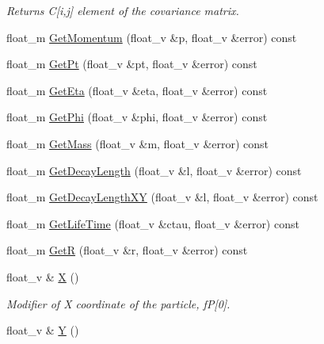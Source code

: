 \begin{DoxyCompactItemize}
\begin{DoxyCompactList}\small\item\em Returns C\mbox{[}i,j\mbox{]} element of the covariance matrix. \end{DoxyCompactList}\item 
float\+\_\+m \hyperlink{classKFParticleBaseSIMD_a7ef771f44d5ef1b9ec3cd6a05567f0f1}{Get\+Momentum} (float\+\_\+v \&p, float\+\_\+v \&error) const 
\item 
float\+\_\+m \hyperlink{classKFParticleBaseSIMD_a2be75da924159255f3dc954e0e6a3271}{Get\+Pt} (float\+\_\+v \&pt, float\+\_\+v \&error) const 
\item 
float\+\_\+m \hyperlink{classKFParticleBaseSIMD_ab67bce164eba1fa6e68b8ffc2eac6e7f}{Get\+Eta} (float\+\_\+v \&eta, float\+\_\+v \&error) const 
\item 
float\+\_\+m \hyperlink{classKFParticleBaseSIMD_a94c1bacdec14ef93110b1dfb141073ad}{Get\+Phi} (float\+\_\+v \&phi, float\+\_\+v \&error) const 
\item 
float\+\_\+m \hyperlink{classKFParticleBaseSIMD_ac8690a32660c0f65990b10c875c2f2af}{Get\+Mass} (float\+\_\+v \&m, float\+\_\+v \&error) const 
\item 
float\+\_\+m \hyperlink{classKFParticleBaseSIMD_a74a930684c0796e5925365cb27a01730}{Get\+Decay\+Length} (float\+\_\+v \&l, float\+\_\+v \&error) const 
\item 
float\+\_\+m \hyperlink{classKFParticleBaseSIMD_a36d374972632038adb3c40d2413af473}{Get\+Decay\+Length\+XY} (float\+\_\+v \&l, float\+\_\+v \&error) const 
\item 
float\+\_\+m \hyperlink{classKFParticleBaseSIMD_afcf43ad8f2972af95843614f71073df8}{Get\+Life\+Time} (float\+\_\+v \&ctau, float\+\_\+v \&error) const 
\item 
float\+\_\+m \hyperlink{classKFParticleBaseSIMD_a39b53aee81bd8fa790629afbf8777804}{GetR} (float\+\_\+v \&r, float\+\_\+v \&error) const 
\item 
float\+\_\+v \& \hyperlink{classKFParticleBaseSIMD_ad595a2d626eaa6bd262e8cfe7e8a4dc4}{X} ()\hypertarget{classKFParticleBaseSIMD_ad595a2d626eaa6bd262e8cfe7e8a4dc4}{}\label{classKFParticleBaseSIMD_ad595a2d626eaa6bd262e8cfe7e8a4dc4}

\begin{DoxyCompactList}\small\item\em Modifier of X coordinate of the particle, fP\mbox{[}0\mbox{]}. \end{DoxyCompactList}\item 
float\+\_\+v \& \hyperlink{classKFParticleBaseSIMD_af9ee57d22217d5adb101c19d944ef437}{Y} ()\hypertarget{classKFParticleBaseSIMD_af9ee57d22217d5adb101c19d944ef437}{}\label{classKFParticleBaseSIMD_af9ee57d22217d5adb101c19d944ef437}


\end{DoxyCompactItemize}
